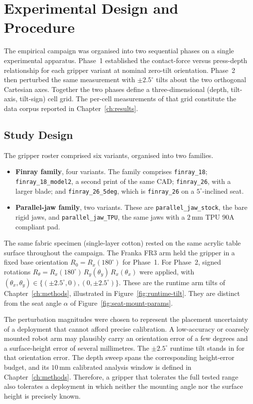 \chapter{\rm\bfseries Experimental Design and Procedure}
\label{ch:experiments}

The empirical campaign was organised into two sequential phases on a
single experimental apparatus. Phase~1 established the contact-force
versus press-depth relationship for each gripper variant at nominal
zero-tilt orientation. Phase~2 then perturbed the same measurement with
$\pm 2.5^{\circ}$ tilts about the two orthogonal Cartesian axes.
Together the two phases define a three-dimensional
(depth, tilt-axis, tilt-sign) cell grid. The per-cell measurements of
that grid constitute the data corpus reported in
Chapter~\ref{ch:results}.

\section{Study Design}
\label{sec:study-design}

The gripper roster comprised six variants, organised into two families.
\begin{itemize}
  \item \textbf{Finray family}, four variants. The family comprises
    \texttt{finray\_18}; \texttt{finray\_18\_model2}, a second print of
    the same CAD; \texttt{finray\_26}, with a larger blade; and
    \texttt{finray\_26\_5deg}, which is \texttt{finray\_26} on a
    $5^{\circ}$-inclined seat.
  \item \textbf{Parallel-jaw family}, two variants. These are
    \texttt{parallel\_jaw\_stock}, the bare rigid jaws, and
    \texttt{parallel\_jaw\_TPU}, the same jaws with a $2$\,mm TPU $90$A
    compliant pad.
\end{itemize}

The same fabric specimen (single-layer cotton) rested on the same
acrylic table surface throughout the campaign. The Franka FR3
arm held the gripper in a fixed base orientation $R_0 = R_x(180^{\circ})$
for Phase~1. For Phase~2, signed rotations
$R_{\theta} = R_x(180^{\circ})\, R_y(\theta_y)\, R_x(\theta_x)$
were applied, with $(\theta_x, \theta_y) \in
\{(\pm 2.5^{\circ}, 0), (0, \pm 2.5^{\circ})\}$. These are the runtime
arm tilts of Chapter~\ref{ch:methods}, illustrated in
Figure~\ref{fig:runtime-tilt}. They are distinct from the seat angle
$\alpha$ of Figure~\ref{fig:seat-mount-params}.

The perturbation magnitudes were chosen to represent the placement
uncertainty of a deployment that cannot afford precise calibration. A
low-accuracy or coarsely mounted robot arm may plausibly carry an
orientation error of a few degrees and a surface-height error of
several millimetres. The $\pm 2.5^{\circ}$ runtime tilt stands in for
that orientation error. The depth sweep spans the corresponding
height-error budget, and its $10$\,mm calibrated analysis window is
defined in Chapter~\ref{ch:methods}. Therefore, a gripper that
tolerates the full tested range also tolerates a deployment in which
neither the mounting angle nor the surface height is precisely known.

